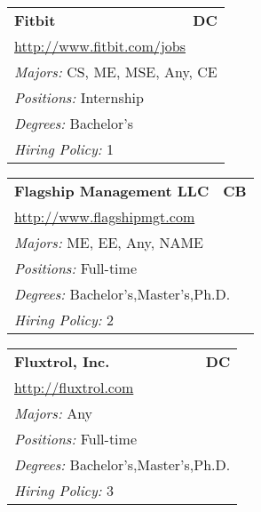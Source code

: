 \documentclass[twoside]{article}
\begin{document}
\begin{center}
\begin{multicols}{3}
\begin{FlushLeft}
\begin{minipage}{.9\columnwidth}
\end{minipage}
 
\begin{minipage}{.9\columnwidth}\begin{tabularx}{.95\columnwidth}{Xr}
                 {\Large\bf Fitbit} & {\Large\bf DC}\\
    \multicolumn{2}{p{.95\columnwidth}}{\url{http://www.fitbit.com/jobs}}\\
    \multicolumn{2}{p{.95\columnwidth}}{\emph{Majors:} CS, ME, MSE, Any, CE}\\
    \multicolumn{2}{p{.95\columnwidth}}{\emph{Positions:} Internship}\\
    \multicolumn{2}{p{.95\columnwidth}}{\emph{Degrees:} Bachelor's}\\
    \multicolumn{2}{p{.95\columnwidth}}{\emph{Hiring Policy:} 1}\\
    \end{tabularx}
    
\end{minipage}
 
\begin{minipage}{.9\columnwidth}\begin{tabularx}{.95\columnwidth}{Xr}
                 {\Large\bf Flagship Management LLC} & {\Large\bf CB}\\
    \multicolumn{2}{p{.95\columnwidth}}{\url{http://www.flagshipmgt.com}}\\
    \multicolumn{2}{p{.95\columnwidth}}{\emph{Majors:} ME, EE, Any, NAME}\\
    \multicolumn{2}{p{.95\columnwidth}}{\emph{Positions:} Full-time}\\
    \multicolumn{2}{p{.95\columnwidth}}{\emph{Degrees:} Bachelor's,Master's,Ph.D.}\\
    \multicolumn{2}{p{.95\columnwidth}}{\emph{Hiring Policy:} 2}\\
    \end{tabularx}
    
\end{minipage}
 
\begin{minipage}{.9\columnwidth}\begin{tabularx}{.95\columnwidth}{Xr}
                 {\Large\bf Fluxtrol, Inc.} & {\Large\bf DC}\\
    \multicolumn{2}{p{.95\columnwidth}}{\url{http://fluxtrol.com}}\\
    \multicolumn{2}{p{.95\columnwidth}}{\emph{Majors:} Any}\\
    \multicolumn{2}{p{.95\columnwidth}}{\emph{Positions:} Full-time}\\
    \multicolumn{2}{p{.95\columnwidth}}{\emph{Degrees:} Bachelor's,Master's,Ph.D.}\\
    \multicolumn{2}{p{.95\columnwidth}}{\emph{Hiring Policy:} 3}\\
    \end{tabularx}
    

\end{minipage}
\end{FlushLeft}
\end{multicols}
\end{center}
\end{document}
